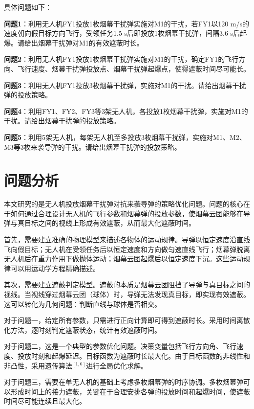 \documentclass[12pt,a4paper]{article}
\begin{document}
\indent 具体问题如下：

\indent \textbf{问题1}：利用无人机FY1投放1枚烟幕干扰弹实施对M1的干扰，若FY1以120 m/s的速度朝向假目标方向飞行，受领任务1.5 s后即投放1枚烟幕干扰弹，间隔3.6 s后起爆。请给出烟幕干扰弹对M1的有效遮蔽时长。

\indent \textbf{问题2}：利用无人机FY1投放1枚烟幕干扰弹实施对M1的干扰，确定FY1的飞行方向、飞行速度、烟幕干扰弹投放点、烟幕干扰弹起爆点，使得遮蔽时间尽可能长。

\indent \textbf{问题3}：利用无人机FY1投放3枚烟幕干扰弹，实施对M1的干扰。请给出烟幕干扰弹的投放策略。

\indent \textbf{问题4}：利用FY1、FY2、FY3等3架无人机，各投放1枚烟幕干扰弹，实施对M1的干扰。请给出烟幕干扰弹的投放策略。

\indent \textbf{问题5}：利用5架无人机，每架无人机至多投放3枚烟幕干扰弹，实施对M1、M2、M3等3枚来袭导弹的干扰。请给出烟幕干扰弹的投放策略。

\section{问题分析}

\indent 本文研究的是无人机投放烟幕干扰弹对抗来袭导弹的策略优化问题。问题的核心在于如何通过合理设计无人机的飞行参数和烟幕弹的投放参数，使烟幕云团能够在导弹与真目标之间的视线上形成有效遮蔽，从而最大化遮蔽时间。

\indent 首先，需要建立准确的物理模型来描述各物体的运动规律。导弹以恒定速度沿直线飞向假目标；无人机在受领任务后以恒定速度和方向做匀速直线飞行；烟幕弹脱离无人机后在重力作用下做抛体运动；烟幕云团起爆后以恒定速度下沉。这些运动规律可以用运动学方程精确描述。

\indent 其次，需要建立遮蔽判定模型。遮蔽的本质是烟幕云团阻挡了导弹与真目标之间的视线。当视线穿过烟幕云团（球体）时，导弹无法发现真目标，即实现有效遮蔽。这可以转化为几何问题：判断直线与球体是否相交。

\indent 对于问题一，给定所有参数，只需进行正向计算即可得到遮蔽时长。采用时间离散化方法，逐时刻判定遮蔽状态，统计有效遮蔽时间。

\indent 对于问题二，这是一个典型的参数优化问题。决策变量包括飞行方向角、飞行速度、投放时刻和起爆延迟。目标函数为遮蔽时长最大化。由于目标函数的非线性和非凸性，采用遗传算法$^{[1,6]}$进行全局优化求解。

\indent 对于问题三，需要在单无人机的基础上考虑多枚烟幕弹的时序协调。多枚烟幕弹可以形成时间上的接力遮蔽，关键在于合理安排各弹的投放时间和起爆时间，使遮蔽时间尽可能连续且最大化。
\end{document}
